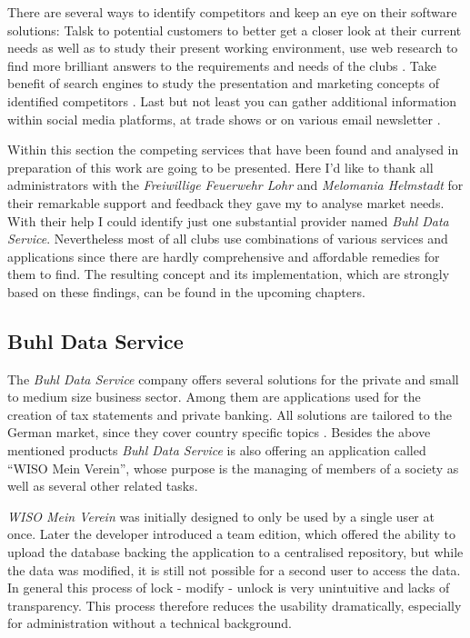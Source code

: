 There are several ways to identify competitors and keep an eye on their software solutions: Talsk to potential customers to better get a closer look at their current needs as well as to study their present working environment, use web research to find more brilliant answers to the requirements and needs of the clubs \cite{Philips:2015aa}. Take benefit of search engines to study the presentation and marketing concepts of identified competitors \cite{Philips:2015aa}. Last but not least you can gather additional information within social media platforms, at trade shows or on various email newsletter \cite{Dahl:2011aa}. 

Within this section the competing services that have been found and analysed in preparation of this work are going to be presented. Here I'd like to thank all administrators with the \emph{Freiwillige Feuerwehr Lohr} and \emph{Melomania Helmstadt} for their remarkable support and feedback they gave my to analyse market needs. With their help I could identify just one substantial provider named \emph{Buhl Data Service}. Nevertheless most of all clubs use combinations of various services and applications since there are hardly comprehensive and affordable remedies for them to find. The resulting concept and its implementation, which are strongly based on these findings, can be found in the upcoming chapters.

\subsection{Buhl Data Service}

The \emph{Buhl Data Service} company offers several solutions for the private and small to medium size business sector. Among them are applications used for the creation of tax statements and private banking. All solutions are tailored to the German market, since they cover country specific topics \cite{Buhl:2015aa}. Besides the above mentioned products \emph{Buhl Data Service} is also offering an application called \enquote{WISO Mein Verein}, whose purpose is the managing of members of a society as well as several other related tasks.

\emph{WISO Mein Verein} was initially designed to only be used by a single user at once. Later the developer introduced a team edition, which offered the ability to upload the database backing the application to a centralised repository, but while the data was modified, it is still not possible for a second user to access the data. In general this process of lock - modify - unlock is very unintuitive and lacks of transparency. This process therefore reduces the usability dramatically, especially for administration without a technical background.

